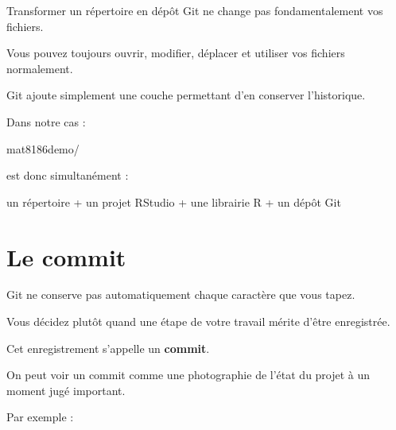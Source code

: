 \documentclass[
  letterpaper,
  DIV=11,
  numbers=noendperiod]{scrreprt}
\newenvironment{Shaded}{\begin{snugshade}}{\end{snugshade}}
\newcommand{\NormalTok}[1]{\textcolor[rgb]{0.00,0.23,0.31}{#1}}
\begin{document}
\begin{tcolorbox}[enhanced jigsaw, arc=.35mm, title=\textcolor{quarto-callout-tip-color}{\faLightbulb}\hspace{0.5em}{Un dépôt reste un répertoire}, colback=white, left=2mm, rightrule=.15mm, toptitle=1mm, opacityback=0, bottomtitle=1mm, breakable, colframe=quarto-callout-tip-color-frame, coltitle=black, toprule=.15mm, titlerule=0mm, opacitybacktitle=0.6, bottomrule=.15mm, colbacktitle=quarto-callout-tip-color!10!white, leftrule=.75mm]

Transformer un répertoire en dépôt Git ne change pas fondamentalement
vos fichiers.

Vous pouvez toujours ouvrir, modifier, déplacer et utiliser vos fichiers
normalement.

Git ajoute simplement une couche permettant d'en conserver l'historique.

\end{tcolorbox}

Dans notre cas :

\begin{Shaded}
\begin{Highlighting}[]
\NormalTok{mat8186demo/}
\end{Highlighting}
\end{Shaded}

est donc simultanément :

\begin{Shaded}
\begin{Highlighting}[]
\NormalTok{un répertoire}
\NormalTok{      +}
\NormalTok{un projet RStudio}
\NormalTok{      +}
\NormalTok{une librairie R}
\NormalTok{      +}
\NormalTok{un dépôt Git}
\end{Highlighting}
\end{Shaded}

\section{Le commit}\label{le-commit}

Git ne conserve pas automatiquement chaque caractère que vous tapez.

Vous décidez plutôt quand une étape de votre travail mérite d'être
enregistrée.

Cet enregistrement s'appelle un \textbf{commit}.

On peut voir un commit comme une photographie de l'état du projet à un
moment jugé important.

Par exemple :
\end{document}
